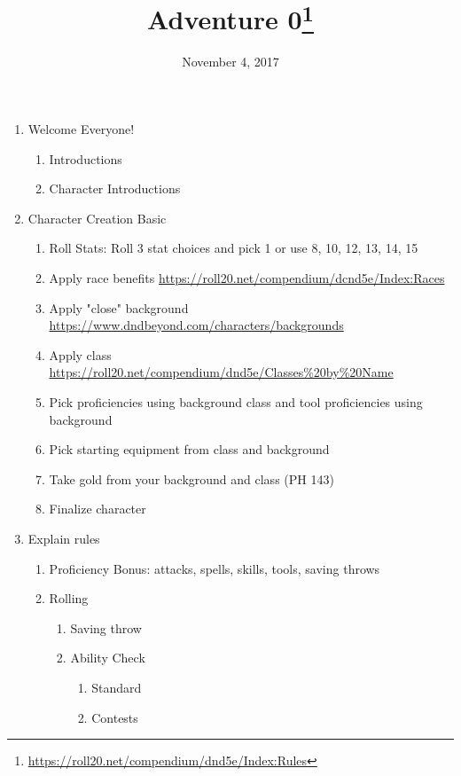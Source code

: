 \documentclass{article}
\begin{document}
  \title{Adventure 0\footnote{\url{https://roll20.net/compendium/dnd5e/Index:Rules}}}
  \date{November 4, 2017}

  \maketitle

  \begin{enumerate}
    \item Welcome Everyone!
      \begin{enumerate}
        \item Introductions
        \item Character Introductions
      \end{enumerate}
    \item Character Creation Basic
      \begin{enumerate}
        \item Roll Stats: Roll 3 stat choices and pick 1 or use 8, 10, 12, 13, 14, 15
        \item Apply race benefits \url{https://roll20.net/compendium/dcnd5e/Index:Races}
        \item Apply "close" background \url{https://www.dndbeyond.com/characters/backgrounds}
        \item Apply class \url{https://roll20.net/compendium/dnd5e/Classes%20by%20Name}
        \item Pick proficiencies using background class and tool proficiencies using background
        \item Pick starting equipment from class and background
        \item Take gold from your background and class (PH 143)
        \item Finalize character
      \end{enumerate}
    \item Explain rules
      \begin{enumerate}
        \item Proficiency Bonus: attacks, spells, skills, tools, saving throws
        \item Rolling
          \begin{enumerate}
            \item Saving throw
            \item Ability Check
              \begin{enumerate}
                \item Standard
                \item Contests

\end{enumerate}
\end{enumerate}
\end{enumerate}
\end{enumerate}
\end{document}
